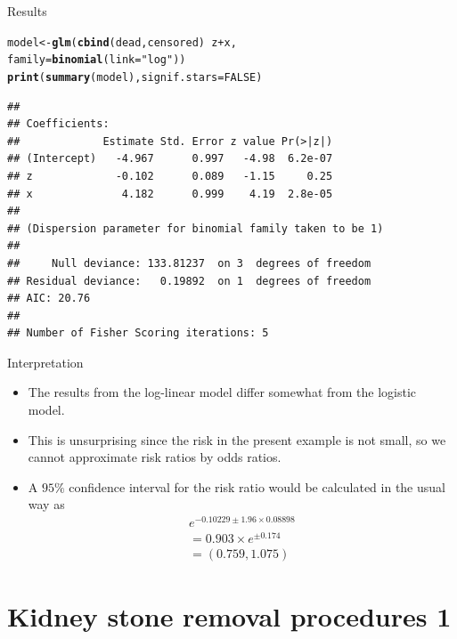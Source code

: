 \documentclass[10pt,handout]{beamer}\usepackage[]{graphicx}\usepackage[]{color}
\makeatletter
\newcommand{\hlnum}[1]{\textcolor[rgb]{0.686,0.059,0.569}{#1}}%
\newcommand{\hlstr}[1]{\textcolor[rgb]{0.192,0.494,0.8}{#1}}%
\newcommand{\hlopt}[1]{\textcolor[rgb]{0,0,0}{#1}}%
\newcommand{\hlstd}[1]{\textcolor[rgb]{0.345,0.345,0.345}{#1}}%
\newcommand{\hlkwb}[1]{\textcolor[rgb]{0.69,0.353,0.396}{#1}}%
\newcommand{\hlkwc}[1]{\textcolor[rgb]{0.333,0.667,0.333}{#1}}%
\newcommand{\hlkwd}[1]{\textcolor[rgb]{0.737,0.353,0.396}{\textbf{#1}}}%
\newenvironment{kframe}{%
 \def\at@end@of@kframe{}%
 \ifinner\ifhmode%
  \def\at@end@of@kframe{\end{minipage}}%
  \begin{minipage}{\columnwidth}%
 \fi\fi%
 \def\FrameCommand##1{\hskip\@totalleftmargin \hskip-\fboxsep
 \colorbox{shadecolor}{##1}\hskip-\fboxsep
     \hskip-\linewidth \hskip-\@totalleftmargin \hskip\columnwidth}%
 \MakeFramed {\advance\hsize-\width
   \@totalleftmargin\z@ \linewidth\hsize
   \@setminipage}}%
 {\par\unskip\endMakeFramed%
 \at@end@of@kframe}
\newenvironment{knitrout}{}{} %
\makeatother
\begin{document}
\begin{frame}[fragile]{Results}
\begin{knitrout}
\color{fgcolor}\begin{kframe}
\begin{alltt}
\hlstd{model} \hlkwb{<-} \hlkwd{glm}\hlstd{(}\hlkwd{cbind}\hlstd{(dead,censored)} \hlopt{~} \hlstd{z} \hlopt{+} \hlstd{x,}
             \hlkwc{family}\hlstd{=}\hlkwd{binomial}\hlstd{(}\hlkwc{link}\hlstd{=}\hlstr{"log"}\hlstd{))}
\hlkwd{print}\hlstd{(}\hlkwd{summary}\hlstd{(model),} \hlkwc{signif.stars} \hlstd{=} \hlnum{FALSE}\hlstd{)}
\end{alltt}
\begin{verbatim}
## 
## Coefficients:
##             Estimate Std. Error z value Pr(>|z|)
## (Intercept)   -4.967      0.997   -4.98  6.2e-07
## z             -0.102      0.089   -1.15     0.25
## x              4.182      0.999    4.19  2.8e-05
## 
## (Dispersion parameter for binomial family taken to be 1)
## 
##     Null deviance: 133.81237  on 3  degrees of freedom
## Residual deviance:   0.19892  on 1  degrees of freedom
## AIC: 20.76
## 
## Number of Fisher Scoring iterations: 5
\end{verbatim}
\end{kframe}
\end{knitrout}
\end{frame}



\begin{frame}[fragile]{Interpretation}
	\begin{itemize}
		\item The results from the log-linear model differ somewhat from the logistic model.
		\item This is unsurprising since the risk in the present example is not small, so we cannot approximate risk ratios by odds ratios.
		\item A $95 \%$ confidence interval for the risk ratio would be
		calculated in the usual way as
		$$
		\begin{array}{l}
		e^{-0.10229 \pm 1.96 \times 0.08898} \\
		=0.903 \times e^{\pm 0.174} \\
		=(0.759,1.075)
		\end{array}
		$$
	\end{itemize}
\end{frame}




\section{Kidney stone removal procedures 1}
\end{document}
